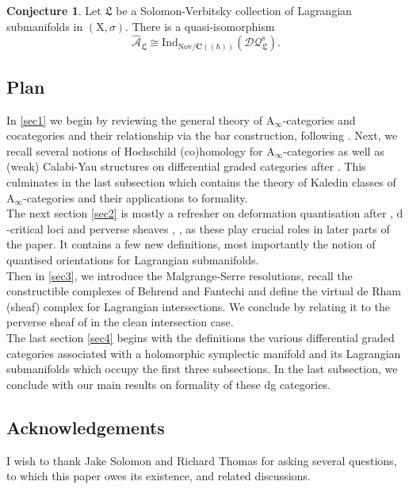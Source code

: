 \documentclass{article}
\theoremstyle{plain}
\theoremstyle{definition}
\newtheorem{conjecture}[theorem]{Conjecture}
\theoremstyle{remark}
\newcommand{\mr}{\mathrm}
\newcommand{\Aa}{\mr{A}_{\infty}}
\newcommand{\C}{\mathbf C}
\newcommand{\cbrak}{(\!(\hbar)\!)}
\newcommand{\3}{\vspace{3mm}}
\newcommand{\2}{\vspace{2mm}}
\newcommand{\1}{\vspace{1mm}}
\begin{document}
\2
 \begin{conjecture}\label{svdq}
  Let $\mathfrak{L}$ be a Solomon-Verbitsky collection of Lagrangian submanifolds in $(\mr{X},\sigma)$. There is a quasi-isomorphism $$\widehat{\mathcal{A}}_\mathfrak{L}\cong \mr{Ind}_{\mr{Nov}/\C\cbrak}\left(\mathcal{DQ}_\mathfrak{L}^{\mr{s}}\right).$$
 \end{conjecture}
 

\subsection{Plan}
In \cref{sec1} we begin by reviewing the general theory of $\Aa$-categories and cocategories and their relationship via the bar construction, following \cite{lefvrehasegawa2003sur}. Next, we recall several notions of Hochschild (co)homology for $\Aa$-categories as well as (weak) Calabi-Yau structures on differential graded categories after \cite{MR3911626}. This culminates in the last subsection which contains the theory of Kaledin classes of $\Aa$-categories and their applications to formality.\\
The next section \cref{sec2} is mostly a refresher on deformation quantisation after \cite{MR3012169}, $\mr{d}$-critical loci and perverse sheaves \cite{bbdjs}, \cite{saf}, as these play crucial roles in later parts of the paper. It contains a few new definitions, most importantly the notion of quantised orientations for Lagrangian submanifolds.\\
Then in \cref{sec3}, we introduce the Malgrange-Serre resolutions, recall the constructible complexes of Behrend and Fantechi \cite{MR2641169} and define the virtual de Rham (sheaf) complex for Lagrangian intersections. We conclude by relating it to the perverse sheaf of \cite{bbdjs} in the clean intersection case.\\
The last section \cref{sec4} begins with the definitions the various differential graded categories associated with a holomorphic symplectic manifold and its Lagrangian submanifolds which occupy the first three subsections. In the last subsection, we conclude with our main results on formality of these dg categories.

\subsection{Acknowledgements}

I wish to thank Jake Solomon and Richard Thomas for asking several questions, to which this paper owes its existence, and related discussions. 
\end{document}
